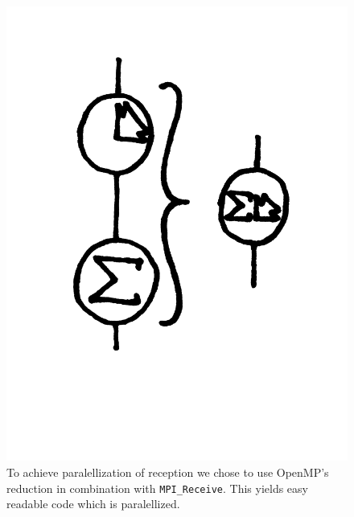 \begin{figure}
\caption{To achieve paralellization of reception we chose to use OpenMP's reduction in combination with {\tt MPI\_Receive}. This yields easy readable code which is paralellized. }
\includegraphics[width=\textwidth]{flyt2}
\end{figure}

